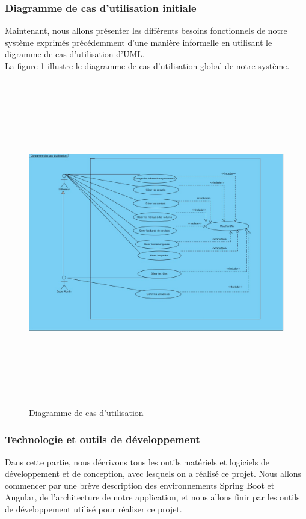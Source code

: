 \documentclass{article}
\begin{document}
\subsubsection{Diagramme de cas d’utilisation initiale}
Maintenant, nous allons présenter les différents besoins fonctionnels de notre système exprimés précédemment d'une manière informelle en utilisant le digramme de cas d'utilisation d'UML.\\
La figure \ref{fig:pic3} illustre le diagramme de cas d'utilisation global de notre système.

\begin{figure}[H]
\centering
\includegraphics[height=5.6in]{UseCaseDiagram1.jpg}
\caption[Figure3 : Diagramme de cas d'utilisation]{Diagramme de cas d'utilisation}
\label{fig:pic3}
\end{figure}
\cleardoublepage
\subsubsection{Technologie et outils de développement}
Dans cette partie, nous décrivons tous les outils matériels et logiciels de développement et de conception, avec lesquels on a réalisé ce projet. Nous allons commencer par une brève description des environnements Spring Boot et Angular, de l’architecture de notre application, et nous allons finir par les outils de développement utilisé pour réaliser ce projet.
\end{document}
